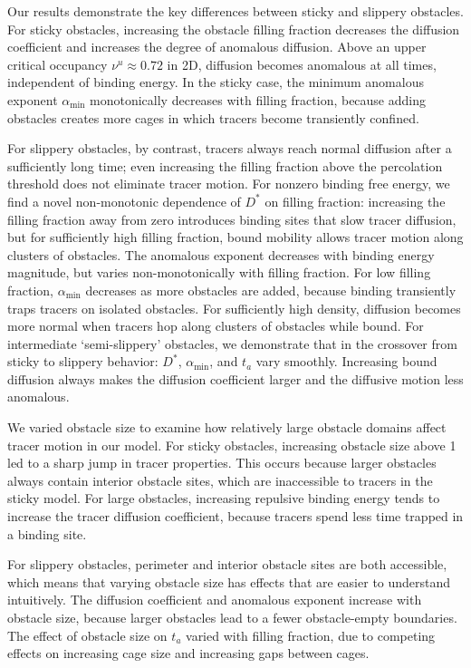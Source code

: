 Our results demonstrate the key differences between sticky and slippery
obstacles.  For sticky obstacles, increasing the obstacle filling fraction
decreases the diffusion coefficient and increases the degree of anomalous
diffusion. Above an upper critical occupancy $ \nu^u \approx 0.72 $ in 2D,
diffusion becomes anomalous at all times, independent of binding energy.  In the
sticky case, the minimum anomalous exponent $ \alpha_{\min} $ monotonically
decreases with filling fraction, because adding obstacles creates more cages in
which tracers become transiently confined.

For slippery obstacles, by contrast, tracers always reach normal diffusion after
a sufficiently long time; even increasing the filling fraction above the
percolation threshold does not eliminate tracer motion. For nonzero binding free
energy, we find a novel non-monotonic dependence of $D^*$ on filling fraction:
increasing the filling fraction away from zero introduces binding sites that
slow tracer diffusion, but for sufficiently high filling fraction, bound
mobility allows tracer motion along clusters of obstacles.  The anomalous
exponent decreases with binding energy magnitude, but varies non-monotonically
with filling fraction. For low filling fraction, $\alpha_{\min}$ decreases as
more obstacles are added, because binding transiently traps tracers on isolated
obstacles. For sufficiently high density, diffusion becomes more normal when
tracers hop along clusters of obstacles while bound.  For intermediate
`semi-slippery' obstacles, we demonstrate that in the crossover from sticky to
slippery behavior: $D^*$, $\alpha_{\min}$, and $t_a$ vary smoothly. Increasing
bound diffusion always makes the diffusion coefficient larger and the diffusive
motion less anomalous.

We varied obstacle size to examine how relatively large obstacle domains affect
tracer motion in our model. For sticky obstacles, increasing obstacle size above
1 led to a sharp jump in tracer properties. This occurs because larger obstacles
always contain interior obstacle sites, which are inaccessible to tracers in the
sticky model.  For large obstacles, increasing repulsive binding energy tends to
increase the tracer diffusion coefficient, because tracers spend less time
trapped in a binding site.
 
For slippery obstacles, perimeter and interior obstacle sites are both
accessible, which means that varying obstacle size has effects that are easier
to understand intuitively. The diffusion coefficient and anomalous exponent
increase with obstacle size, because larger obstacles lead to a fewer
obstacle-empty boundaries.  The effect of obstacle size on $t_a$ varied with
filling fraction, due to competing effects on increasing cage size and
increasing gaps between cages.

